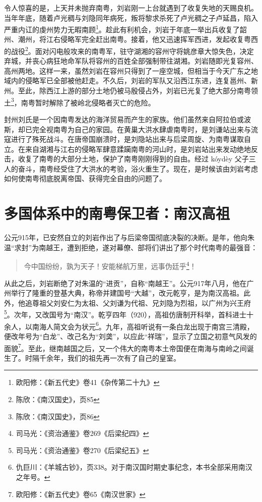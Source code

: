 令人惊喜的是，上天并未抛弃南粤，刘岩刚一上台就遇到了收复失地的天赐良机。当年年底，随着卢光稠与刘隐同年病死，叛将黎求杀死了卢光稠之子卢延昌，陷入严重内讧的虔州势力无暇南顾\footnote{欧阳修：《新五代史》卷41《杂传第二十九》}。趁此有利机会，刘岩于年底一举出兵收复了韶州、潮州，将江右侵略军完全赶出南粤。接着，他又迅速挥军西进，发起收复粤西的战役\footnote{陈欣：《南汉国史》，页85}。面对闪电般攻来的南粤军，驻守湖湘的容州守将姚彦章大惊失色，决定弃城，并丧心病狂地命军队将容州的百姓全部强制带往湖湘。刘岩随即光复容州、高州两地。这样一来，虽然刘岩在容州只得到了一座空城，但相当于今天广东之地域内的侵略军已全部被他赶走。不久后，刘岩的军队又沿西江东进，连复邕州、新州。至此，除西江上游的部分土地仍被马殷侵占外，刘岩已光复了绝大部分南粤领土\footnote{陈欣：《南汉国史》，页86}，南粤暂时解除了被岭北侵略者灭亡的危险。

封州刘氏是一个因南粤发达的海洋贸易而产生的家族。他们虽然来自阿拉伯或波斯，却已完全视南粤为自己的家园。在黄巢大洪水肆虐南粤时，是刘谦站出来与流寇进行了殊死战斗。在唐帝国崩溃时，是刘隐站出来与后梁周旋、为南粤谋取自立。在来自湖湘与江右的侵略军肆意蹂躏南粤的河山时，是刘岩站出来发动绝地反击，收复了南粤的大部分土地，保护了南粤刚刚得到的自由。经过 kóydèy 父子三人的奋斗，南粤经受住了大洪水的考验，浴火重生了。现在，是时候该由刘岩考虑如何使南粤彻底脱离帝国、获得完全自由的问题了。


\section{多国体系中的南粤保卫者：南汉高祖}

公元915年，已安然自立的刘岩作出了与后梁帝国彻底决裂的决断。是年，他向朱温“求封”为南越王，遭到拒绝，遂对幕僚、部将们讲出了那个时代南粤的最强音：

\begin{quote}
	
今中国纷纷，孰为天子！安能梯航万里，远事伪廷乎\footnote{司马光：《资治通鉴》卷269《后梁纪四》}！

\end{quote}

从此之后，刘岩断绝了对朱温的“进贡”，自称“南越王”。公元917年八月，他在广州举行了隆重的登基大典，称帝并建国号“大越”，改元乾亨，是为南汉高祖。此外，他追尊祖父刘安仁为太祖、父刘谦为代祖、兄刘隐为烈祖，以广州为兴王府\footnote{司马光：《资治通鉴》卷270《后梁纪五》}。次年，又改国号为“南汉”。乾亨四年（920），高祖仿唐制开科举，首科进士十余人，以南海人简文会为状元\footnote{仇巨川：《羊城古钞》，页338。对于南汉国时期史事纪念，本书全部采用南汉之年号。}。九年，高祖听说有一条白龙出现于南宫三清殿，便改年号为“白龙”、改己名为“刘䶮”，以应此“祥瑞”，显示了立国之初意气风发的面貌\footnote{欧阳修：《新五代史》卷65《南汉世家》}。至此，继南越国之后，又一个伟大的南粤本土帝国便在南海与南岭之间诞生了。时隔千余年，我们的祖先再一次有了自己的皇室。

